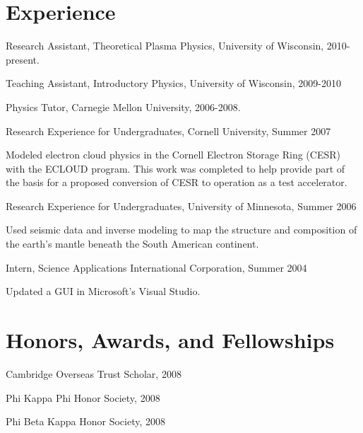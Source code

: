 \documentclass[letterpaper]{article}
\renewenvironment{itemize}{
  \begin{list}{}{
    \setlength{\leftmargin}{1.5em}
  }
}{
  \end{list}
}
\begin{document}
\section*{Experience}

\begin{itemize}
\item Research Assistant, Theoretical Plasma Physics, University of Wisconsin, 2010-present.
\item Teaching Assistant, Introductory Physics, University of Wisconsin, 2009-2010
\item Physics Tutor, Carnegie Mellon University, 2006-2008.
\item Research Experience for Undergraduates, Cornell University, Summer 2007
\begin{itemize}
\item Modeled electron cloud physics in the Cornell Electron Storage Ring (CESR) with the ECLOUD program. This work was completed to help provide part of the basis for a proposed conversion of CESR to operation as a test accelerator.
\end{itemize}
\item Research Experience for Undergraduates, University of Minnesota, Summer 2006
\begin{itemize}
\item Used seismic data and inverse modeling to map the structure and composition of the earth's mantle beneath the South American continent.
\end{itemize}
\item Intern, Science Applications International Corporation, Summer 2004
\begin{itemize}
\item Updated a GUI in Microsoft's Visual Studio.
\end{itemize}
\end{itemize}


\section*{Honors, Awards, and Fellowships}

\begin{itemize}
\item Cambridge Overseas Trust Scholar, 2008
\item Phi Kappa Phi Honor Society, 2008
\item Phi Beta Kappa Honor Society, 2008
\end{itemize}
\end{document}
